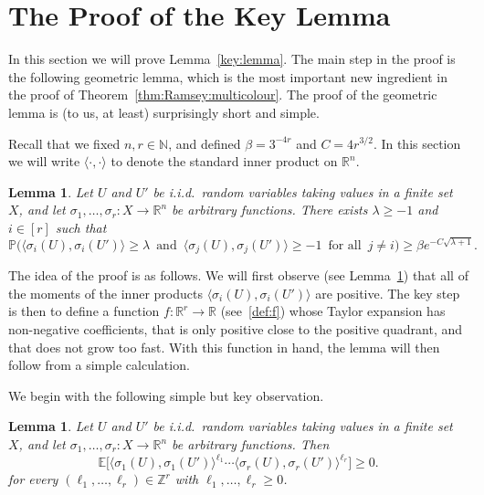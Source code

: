 \documentclass[12pt,reqno]{amsart}
\newtheorem{lemma}[theorem]{Lemma}
\theoremstyle{definition}
\theoremstyle{remark}
\newcommand\N{\mathbb{N}}
\newcommand\R{\mathbb{R}}
\newcommand\Z{\mathbb{Z}}
\def\Pr{\mathbb{P}}
\newcommand\Ex{\mathbb{E}}
\renewcommand{\ge}{\geqslant}
\renewcommand{\to}{\rightarrow}
\def\R{\mathbb{R}}
\def\Z{\mathbb{Z}}
\def\N{\mathbb{N}}
\begin{document}
\section{The Proof of the Key Lemma}\label{sec:key:lemma}

In this section we will prove Lemma~\ref{key:lemma}. The main step in the proof is the following geometric lemma, which is the most important new ingredient in the proof of Theorem~\ref{thm:Ramsey:multicolour}. The proof of the geometric lemma is (to us, at least) surprisingly short and simple. 

Recall that we fixed $n,r \in \N$, and defined $\beta = 3^{-4r}$ and $C = 4r^{3/2}$. In this section we will write $\langle\cdot,\cdot\rangle$ to denote the standard inner product on $\R^n$.  

\begin{lemma}\label{lem:lambda}
Let\/ $U$ and\/ $U'$ be i.i.d.~random variables taking values in a finite set~$X$, and let $\sigma_1,\ldots,\sigma_r \colon X \to \R^n$ be arbitrary functions. There exists $\lambda\ge-1$ and\/ $i\in[r]$ such that
$$\Pr\Big( \big\langle \sigma_i(U),\sigma_i(U') \big\rangle \ge \lambda \, \text{ and } \, \big\langle \sigma_j(U), \sigma_j(U') \big\rangle \ge -1 \, \text{ for all } \, j \ne i \Big) \ge \beta e^{- C\sqrt{\lambda + 1}}.$$
\end{lemma}

The idea of the proof is as follows. We will first observe (see Lemma~\ref{lem:moments}) that all of the moments of the inner products $\langle \sigma_i(U),\sigma_i(U') \rangle$ are positive. The key step is then to define a function $f \colon \R^r \to \R$ (see~\eqref{def:f}) whose Taylor expansion has non-negative coefficients, that is only positive close to the positive quadrant, and that does not grow too fast. With this function in hand, the lemma will then follow from a simple calculation. 

We begin with the following simple but key observation. 

\begin{lemma}\label{lem:moments}
Let $U$ and\/ $U'$ be i.i.d.~random variables taking values in a finite set~$X$, and let\/ $\sigma_1,\ldots,\sigma_r \colon X \to \R^n$ be arbitrary functions. Then
$$\Ex\Big[ \big\langle \sigma_1(U),\sigma_1(U') \big\rangle^{\ell_1} \cdots \big\langle \sigma_r(U),\sigma_r(U') \big\rangle^{\ell_r} \Big] \ge 0.$$
for every $(\ell_1,\dots,\ell_r) \in \Z^r$ with $\ell_1,\dots,\ell_r \ge 0$.
\end{lemma}
\end{document}
